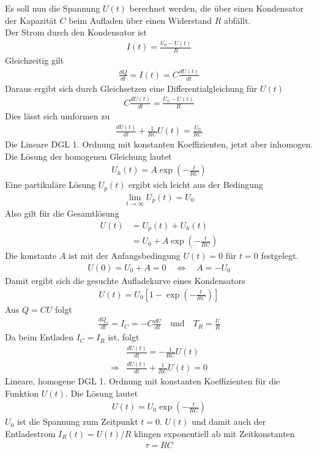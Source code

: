 \documentclass{article}
\begin{document}
\noindent Es soll nun die Spannung $U(t)$ berechnet werden,
die über einen Kondensator der Kapazität $C$ beim Aufladen über einen Widerstand $R$ 
abfällt.\\
Der Strom durch den Kondensator ist 
\begin{align}
    I(t)=\frac{U_0-U(t)}{R}
\end{align}
Gleichzeitig gilt
\begin{align}
    \frac{d Q}{dt}=I(t)=C\frac{dU(t)}{dt}
\end{align}
Daraus ergibt sich durch Gleichsetzen eine Differentialgleichung für $U(t)$
\begin{align}
    C\frac{dU(t)}{dt}=\frac{U_0-U(t)}{R}
\end{align}
Dies lässt sich umformen zu 
\begin{align}
    \frac{dU(t)}{dt}+\frac{1}{RC}U(t)=\frac{U_0}{RC}
\end{align}
Die Lineare DGL 1. Ordnung mit konstanten Koeffizienten, jetzt aber inhomogen.\\

\noindent Die Lösung der homogenen Gleichung lautet 
\begin{align}
    U_h(t)=A\exp\left(-\frac{t}{RC}\right)
\end{align}
Eine partikuläre Lösung $U_p(t)$ ergibt sich leicht aus der Bedingung
\begin{align}
    \lim_{t\to\infty} U_p(t)=U_0
\end{align}
Also gilt für die Gesamtlösung
\begin{align}
    U(t)&=U_p(t)+U_h(t)\\
    &=U_0+A\exp\left(-\frac{t}{RC}\right)
\end{align}
Die konstante $A$ ist mit der Anfangsbedingung $U(t)=0$ für
$t=0$ festgelegt.
\begin{align}
    U(0)=U_0+A=0\quad \Leftrightarrow \quad A=-U_0
\end{align}
Damit ergibt sich die gesuchte Aufladekurve eines Kondensators
\begin{align}
    U(t)=U_0\left[1-\exp\left(-\frac{t}{RC}\right)\right]
\end{align}
Aus $Q=CU$ folgt
\begin{align}
    \frac{dQ_c}{dt}=I_C=-C\frac{dU}{dt} \quad \text{und}\quad T_R=\frac{U}{R}
\end{align}
Da beim Entladen $I_C=I_R$ ist, folgt
\begin{align}
    &\frac{dU(t)}{dt}=-\frac{1}{RC}U(t)\\
    \Rightarrow &\frac{dU(t)}{dt}+\frac{1}{RC}U(t)=0
\end{align}
Lineare, homogene DGL 1. Ordnung mit konstanten Koeffizienten
für die Funktion $U(t)$. Die Lösung lautet 
\begin{align}
    U(t)=U_0\exp\left(-\frac{t}{RC}\right)
\end{align}
$U_0$ ist die Spannung zum Zeitpunkt $t=0$. $U(t)$ und damit auch der Entladestrom
$I_R(t)=U(t)/R$ klingen exponentiell ab mit Zeitkonstanten
\begin{align}
    \tau=RC
\end{align}
\end{document}
